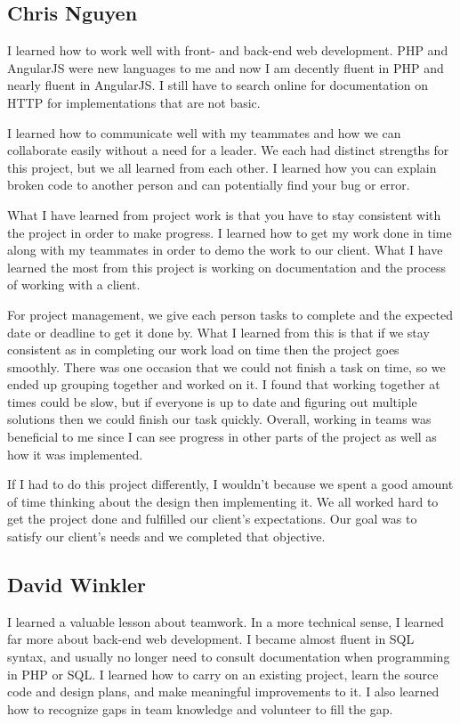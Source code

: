 \documentclass[onecolumn]{IEEEtran}
\begin{document}
\subsection{Chris Nguyen}
I learned how to work well with front- and back-end web development. PHP and AngularJS were new languages to me and now I am decently fluent in PHP and nearly fluent in AngularJS. I still have to search online for documentation on HTTP for implementations that are not basic.  

I learned how to communicate well with my teammates and how we can collaborate easily without a need for a leader. We each had distinct strengths for this project, but we all learned from each other. I learned how you can explain broken code to another person and can potentially find your bug or error. 

What I have learned from project work is that you have to stay consistent with the project in order to make progress. I learned how to get my work done in time along with my teammates in order to demo the work to our client. What I have learned the most from this project is working on documentation and the process of working with a client.  

For project management, we give each person tasks to complete and the expected date or deadline to get it done by. What I learned from this is that if we stay consistent as in completing our work load on time then the project goes smoothly. There was one occasion that we could not finish a task on time, so we ended up grouping together and worked on it. I found that working together at times could be slow, but if everyone is up to date and figuring out multiple solutions then we could finish our task quickly. Overall, working in teams was beneficial to me since I can see progress in other parts of the project as well as how it was implemented.  

If I had to do this project differently, I wouldn't because we spent a good amount of time thinking about the design then implementing it. We all worked hard to get the project done and fulfilled our client's expectations. Our goal was to satisfy our client's needs and we completed that objective. 

\subsection{David Winkler}
I learned a valuable lesson about teamwork. In a more technical sense, I learned far more about back-end web development. I became almost fluent in SQL syntax, and usually no longer need to consult documentation when programming in PHP or SQL. I learned how to carry on an existing project, learn the source code and design plans, and make meaningful improvements to it. I also learned how to recognize gaps in team knowledge and volunteer to fill the gap.  
\end{document}
